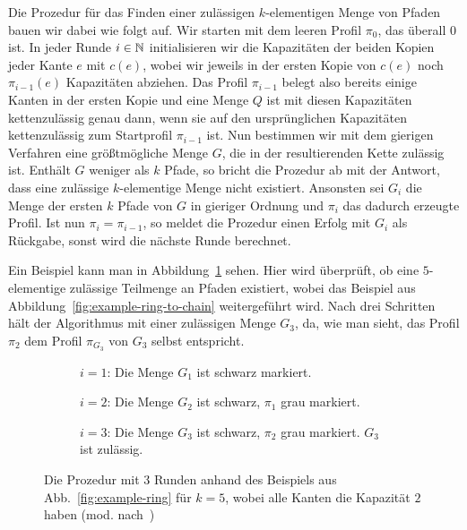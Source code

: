 Die Prozedur für das Finden einer zulässigen $k$-elementigen Menge von Pfaden bauen wir dabei wie folgt auf.
Wir starten mit dem leeren Profil $\pi_0$, das überall 0 ist.
In jeder Runde $i \in \mathbb N$ initialisieren wir die Kapazitäten der beiden Kopien jeder Kante $e$ mit $c(e)$, wobei wir jeweils
in der ersten Kopie von $c(e)$ noch $\pi_{i-1}(e)$ Kapazitäten abziehen.
Das Profil $\pi_{i-1}$ belegt also bereits einige Kanten in der ersten Kopie und eine Menge $Q$ ist mit diesen Kapazitäten
kettenzulässig genau dann, wenn sie auf den ursprünglichen Kapazitäten kettenzulässig zum Startprofil $\pi_{i-1}$ ist.
Nun bestimmen wir mit dem gierigen Verfahren eine größtmögliche Menge $G$, die in der resultierenden Kette
zulässig ist.
Enthält $G$ weniger als $k$ Pfade, so bricht die Prozedur ab mit der Antwort, dass eine zulässige $k$-elementige Menge
nicht existiert.
Ansonsten sei $G_i$ die Menge der ersten $k$ Pfade von $G$ in gieriger Ordnung und $\pi_{i}$ das dadurch erzeugte
Profil.
Ist nun $\pi_i = \pi_{i-1}$, so meldet die Prozedur einen Erfolg mit $G_i$ als Rückgabe, sonst wird die nächste Runde
berechnet.

Ein Beispiel kann man in Abbildung~\ref{fig:example-ring-procedure} sehen.
Hier wird überprüft, ob eine $5$-elementige zulässige Teilmenge an Pfaden existiert, wobei
das Beispiel aus Abbildung~\ref{fig:example-ring-to-chain} weitergeführt wird.
Nach drei Schritten hält der Algorithmus mit einer zulässigen Menge $G_3$, da, wie man sieht, das Profil $\pi_2$
dem Profil $\pi_{G_3}$ von $G_3$ selbst entspricht.

\begin{figure}[h]
	\begin{subfigure}{\textwidth}
		\centering
		\def\svgwidth{230bp}
		
		\caption{$i=1$: Die Menge $G_1$ ist schwarz markiert.}
	\end{subfigure}
	\begin{subfigure}{\textwidth}
		\centering
		\def\svgwidth{230bp}
		
		\caption{$i=2$: Die Menge $G_2$ ist schwarz, $\pi_1$ grau markiert.}
	\end{subfigure}
	\begin{subfigure}{\textwidth}
		\centering
		\def\svgwidth{230bp}
		
		\caption{$i=3$: Die Menge $G_3$ ist schwarz, $\pi_2$ grau markiert. $G_3$ ist zulässig.}
	\end{subfigure}
	\caption{Die Prozedur mit 3 Runden anhand des Beispiels aus Abb.~\ref{fig:example-ring} für $k=5$, wobei alle Kanten die Kapazität $2$ haben (mod. nach~\cite{paper})}
	\label{fig:example-ring-procedure}
\end{figure}

